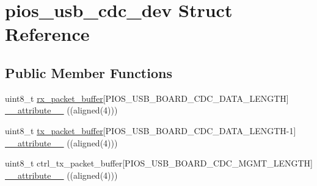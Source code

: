 \hypertarget{structpios__usb__cdc__dev}{\section{pios\-\_\-usb\-\_\-cdc\-\_\-dev \-Struct \-Reference}
\label{structpios__usb__cdc__dev}
}
\subsection*{\-Public \-Member \-Functions}
\begin{DoxyCompactItemize}
\item 
uint8\-\_\-t \hyperlink{group___p_i_o_s___u_s_b___c_o_m_ga82f6a571f9bf92fae2d7368be2407a27}{rx\-\_\-packet\-\_\-buffer}\mbox{[}\-P\-I\-O\-S\-\_\-\-U\-S\-B\-\_\-\-B\-O\-A\-R\-D\-\_\-\-C\-D\-C\-\_\-\-D\-A\-T\-A\-\_\-\-L\-E\-N\-G\-T\-H\mbox{]} \hyperlink{group___p_i_o_s___u_s_b___c_o_m_gab58a69ef6ffba4b36cf99ba5dfd9798c}{\-\_\-\-\_\-attribute\-\_\-\-\_\-} ((aligned(4)))
\item 
uint8\-\_\-t \hyperlink{group___p_i_o_s___u_s_b___c_o_m_ga1b086465e042517001948516cfa908d1}{tx\-\_\-packet\-\_\-buffer}\mbox{[}\-P\-I\-O\-S\-\_\-\-U\-S\-B\-\_\-\-B\-O\-A\-R\-D\-\_\-\-C\-D\-C\-\_\-\-D\-A\-T\-A\-\_\-\-L\-E\-N\-G\-T\-H-\/1\mbox{]} \hyperlink{structpios__usb__cdc__dev_gab58a69ef6ffba4b36cf99ba5dfd9798c}{\-\_\-\-\_\-attribute\-\_\-\-\_\-} ((aligned(4)))
\item 
uint8\-\_\-t ctrl\-\_\-tx\-\_\-packet\-\_\-buffer\mbox{[}\-P\-I\-O\-S\-\_\-\-U\-S\-B\-\_\-\-B\-O\-A\-R\-D\-\_\-\-C\-D\-C\-\_\-\-M\-G\-M\-T\-\_\-\-L\-E\-N\-G\-T\-H\mbox{]} \hyperlink{structpios__usb__cdc__dev_gab58a69ef6ffba4b36cf99ba5dfd9798c}{\-\_\-\-\_\-attribute\-\_\-\-\_\-} ((aligned(4)))
\end{DoxyCompactItemize}
